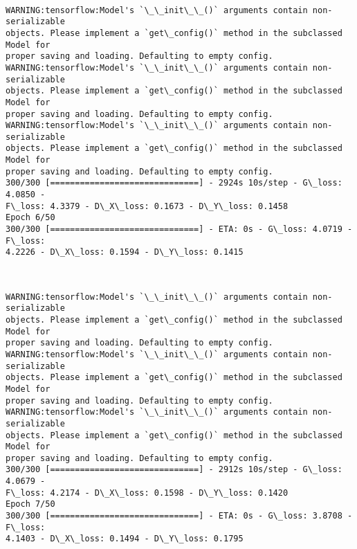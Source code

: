 \documentclass[11pt]{article}
\begin{document}
    \begin{center}
    \end{center}
    { \hspace*{\fill} \\}
    
    \begin{Verbatim}[commandchars=\\\{\}]
WARNING:tensorflow:Model's `\_\_init\_\_()` arguments contain non-serializable
objects. Please implement a `get\_config()` method in the subclassed Model for
proper saving and loading. Defaulting to empty config.
WARNING:tensorflow:Model's `\_\_init\_\_()` arguments contain non-serializable
objects. Please implement a `get\_config()` method in the subclassed Model for
proper saving and loading. Defaulting to empty config.
WARNING:tensorflow:Model's `\_\_init\_\_()` arguments contain non-serializable
objects. Please implement a `get\_config()` method in the subclassed Model for
proper saving and loading. Defaulting to empty config.
300/300 [==============================] - 2924s 10s/step - G\_loss: 4.0850 -
F\_loss: 4.3379 - D\_X\_loss: 0.1673 - D\_Y\_loss: 0.1458
Epoch 6/50
300/300 [==============================] - ETA: 0s - G\_loss: 4.0719 - F\_loss:
4.2226 - D\_X\_loss: 0.1594 - D\_Y\_loss: 0.1415
    \end{Verbatim}

    \begin{center}
    \end{center}
    { \hspace*{\fill} \\}
    
    \begin{Verbatim}[commandchars=\\\{\}]
WARNING:tensorflow:Model's `\_\_init\_\_()` arguments contain non-serializable
objects. Please implement a `get\_config()` method in the subclassed Model for
proper saving and loading. Defaulting to empty config.
WARNING:tensorflow:Model's `\_\_init\_\_()` arguments contain non-serializable
objects. Please implement a `get\_config()` method in the subclassed Model for
proper saving and loading. Defaulting to empty config.
WARNING:tensorflow:Model's `\_\_init\_\_()` arguments contain non-serializable
objects. Please implement a `get\_config()` method in the subclassed Model for
proper saving and loading. Defaulting to empty config.
300/300 [==============================] - 2912s 10s/step - G\_loss: 4.0679 -
F\_loss: 4.2174 - D\_X\_loss: 0.1598 - D\_Y\_loss: 0.1420
Epoch 7/50
300/300 [==============================] - ETA: 0s - G\_loss: 3.8708 - F\_loss:
4.1403 - D\_X\_loss: 0.1494 - D\_Y\_loss: 0.1795
    \end{Verbatim}
\end{document}
